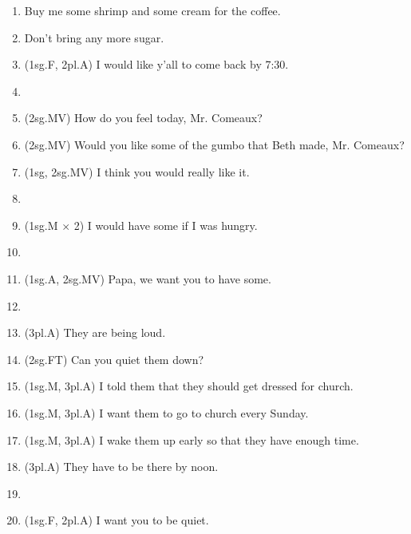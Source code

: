 \begin{enumerate}
    \item Buy me some shrimp and some cream for the coffee.
    \item Don't bring any more sugar.
    \item (1sg.F, 2pl.A) I would like y'all to come back by 7:30.
    \item[] \\
    \item (2sg.MV) How do you feel today, Mr. Comeaux?
    \item (2sg.MV) Would you like some of the gumbo that Beth made, Mr. Comeaux?
    \item (1sg, 2sg.MV) I think you would really like it.
    \item[] \\
    \item (1sg.M $\times$ 2) I would have some if I was hungry.
    \item[] \\
    \item (1sg.A, 2sg.MV) Papa, we want you to have some.
    \item[] \\
    \item (3pl.A) They are being loud.
    \item (2sg.FT) Can you quiet them down?
    \item (1sg.M, 3pl.A) I told them that they should get dressed for church.
    \item (1sg.M, 3pl.A) I want them to go to church every Sunday.
    \item (1sg.M, 3pl.A) I wake them up early so that they have enough time.
    \item (3pl.A) They have to be there by noon.
    \item[] \\
    \item (1sg.F, 2pl.A) I want you to be quiet.

\end{enumerate}
